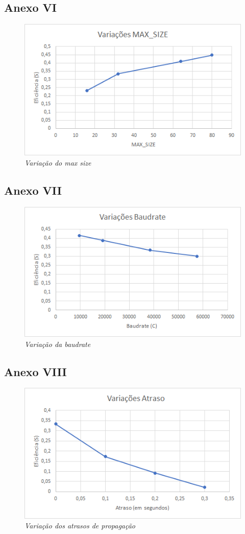 \documentclass[article, a4paper, 11pt, oneside]{memoir}
\begin{document}
\subsection{Anexo VI}
\begin{figure}[h]
	\centering
\includegraphics[scale=0.7]{maxsize.png}
\caption{\emph{Variação do max size}}
\end{figure}

\newpage
\subsection{Anexo VII}
\begin{figure}[h]
	\centering
\includegraphics[scale=0.7]{baudrate.png}
\caption{\emph{Variação da baudrate}}
\end{figure}

\subsection{Anexo VIII}
\begin{figure}[h]
	\centering
\includegraphics[scale=0.7]{atraso.png}
\caption{\emph{Variação dos atrasos de propagação}}
\end{figure}
\end{document}
